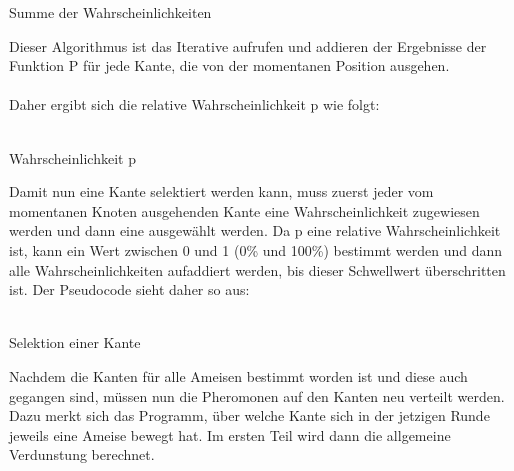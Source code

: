 \documentclass[12pt]{article}
\begin{document}
\begin{algorithm}[H]
\caption{Summe der Wahrscheinlichkeiten}
\DontPrintSemicolon
{}
\end{algorithm}Dieser Algorithmus ist das Iterative aufrufen und addieren der Ergebnisse der Funktion P für jede Kante, die von der momentanen Position ausgehen.\\\\
Daher ergibt sich die relative Wahrscheinlichkeit p wie folgt:\\\\
\begin{algorithm}[H]
\caption{Wahrscheinlichkeit p}
\DontPrintSemicolon
{}
\end{algorithm}Damit nun eine Kante selektiert werden kann, muss zuerst jeder vom momentanen Knoten ausgehenden Kante eine Wahrscheinlichkeit zugewiesen werden und dann eine ausgewählt werden. Da p eine relative Wahrscheinlichkeit ist, kann ein Wert zwischen 0 und 1 (0\% und 100\%) bestimmt werden und dann alle Wahrscheinlichkeiten aufaddiert werden, bis dieser Schwellwert überschritten ist. Der Pseudocode sieht daher so aus:\\\\
\begin{algorithm}[H]
\caption{Selektion einer Kante}
\DontPrintSemicolon
{}
\end{algorithm}Nachdem die Kanten für alle Ameisen bestimmt worden ist und diese auch gegangen sind, müssen nun die Pheromonen auf den Kanten neu verteilt werden. Dazu merkt sich das Programm, über welche Kante sich in der jetzigen Runde jeweils eine Ameise bewegt hat. Im ersten Teil wird dann die allgemeine Verdunstung berechnet.\\\\
\end{document}
